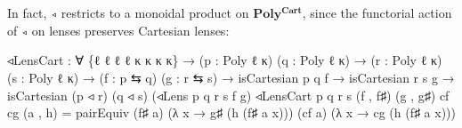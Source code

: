 \documentclass[
  11pt,
  oneside,
  article]{memoir}
\newenvironment{Shaded}{}{}
\newcommand{\NormalTok}[1]{#1}
\newcommand{\OtherTok}[1]{\textcolor[rgb]{0.00,0.44,0.13}{#1}}
\theoremstyle{definition}
\theoremstyle{plain}
\newcommand{\0}{\textsf{0}}
\newcommand{\1}{\tn{\textsf{1}}}
\begin{document}
In fact, \texttt{◃} restricts to a monoidal product on
\(\mathbf{Poly^{Cart}}\), since the functorial action of \texttt{◃} on
lenses preserves Cartesian lenses:

\begin{Shaded}
\begin{Highlighting}[]
\NormalTok{◃LensCart }\OtherTok{:} \OtherTok{∀} \OtherTok{\{}\NormalTok{ℓ ℓ\textquotesingle{} ℓ\textquotesingle{}\textquotesingle{} ℓ\textquotesingle{}\textquotesingle{}\textquotesingle{} κ κ\textquotesingle{} κ\textquotesingle{}\textquotesingle{} κ\textquotesingle{}\textquotesingle{}\textquotesingle{}}\OtherTok{\}}
            \OtherTok{→} \OtherTok{(}\NormalTok{p }\OtherTok{:}\NormalTok{ Poly ℓ κ}\OtherTok{)} \OtherTok{(}\NormalTok{q }\OtherTok{:}\NormalTok{ Poly ℓ\textquotesingle{} κ\textquotesingle{}}\OtherTok{)}
            \OtherTok{→} \OtherTok{(}\NormalTok{r }\OtherTok{:}\NormalTok{ Poly ℓ\textquotesingle{}\textquotesingle{} κ\textquotesingle{}\textquotesingle{}}\OtherTok{)} \OtherTok{(}\NormalTok{s }\OtherTok{:}\NormalTok{ Poly ℓ\textquotesingle{}\textquotesingle{}\textquotesingle{} κ\textquotesingle{}\textquotesingle{}\textquotesingle{}}\OtherTok{)}
            \OtherTok{→} \OtherTok{(}\NormalTok{f }\OtherTok{:}\NormalTok{ p ⇆ q}\OtherTok{)} \OtherTok{(}\NormalTok{g }\OtherTok{:}\NormalTok{ r ⇆ s}\OtherTok{)}
            \OtherTok{→}\NormalTok{ isCartesian p q f }\OtherTok{→}\NormalTok{ isCartesian r s g}
            \OtherTok{→}\NormalTok{ isCartesian }\OtherTok{(}\NormalTok{p ◃ r}\OtherTok{)} \OtherTok{(}\NormalTok{q ◃ s}\OtherTok{)}
                          \OtherTok{(}\NormalTok{◃Lens p q r s f g}\OtherTok{)}
\NormalTok{◃LensCart p q r s }\OtherTok{(}\NormalTok{f , f♯}\OtherTok{)} \OtherTok{(}\NormalTok{g , g♯}\OtherTok{)}\NormalTok{ cf cg }\OtherTok{(}\NormalTok{a , h}\OtherTok{)} \OtherTok{=} 
\NormalTok{    pairEquiv }\OtherTok{(}\NormalTok{f♯ a}\OtherTok{)} \OtherTok{(λ}\NormalTok{ x }\OtherTok{→}\NormalTok{ g♯ }\OtherTok{(}\NormalTok{h }\OtherTok{(}\NormalTok{f♯ a x}\OtherTok{)))} 
              \OtherTok{(}\NormalTok{cf a}\OtherTok{)} \OtherTok{(λ}\NormalTok{ x }\OtherTok{→}\NormalTok{ cg }\OtherTok{(}\NormalTok{h }\OtherTok{(}\NormalTok{f♯ a x}\OtherTok{)))}
\end{Highlighting}
\end{Shaded}
\end{document}
